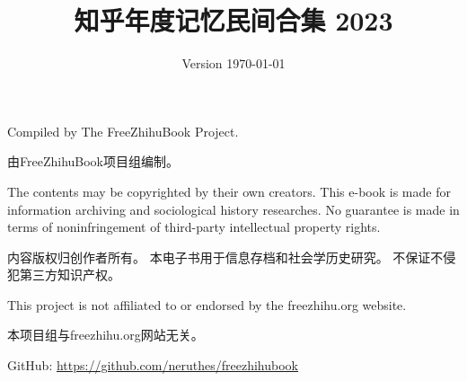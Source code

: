 \documentclass[11pt,a4paper]{report}
\title{知乎年度记忆民间合集 2023}
\author{}
\date{Version \today}
\begin{document}
\begin{titlepage}
    \maketitle
\end{titlepage}
\tableofcontents\clearpage









\clearpage
\pagestyle{empty}
\leavevmode\vfill\small\sffamily
Compiled by The FreeZhihuBook Project.

由FreeZhihuBook项目组编制。

The contents may be copyrighted by their own creators.
This e-book is made for information archiving and sociological history researches.
No guarantee is made in terms of noninfringement of third-party intellectual property rights.

内容版权归创作者所有。
本电子书用于信息存档和社会学历史研究。
不保证不侵犯第三方知识产权。

This project is not affiliated to or endorsed by the freezhihu.org website.

本项目组与freezhihu.org网站无关。

GitHub: \href{https://github.com/neruthes/freezhihubook}{https://github.com/neruthes/freezhihubook}
\end{document}

